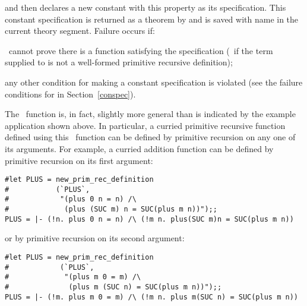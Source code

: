 {{\noindent and then declares a new constant  with this property as its
specification. This constant specification is returned as a theorem by 
 and is saved with name 
in the current theory segment. Failure occurs if:

\begin{myenumerate}
\item \HOL\ cannot prove there is a function satisfying the specification
(\ie\ if the term supplied to  
 is not a well-formed primitive recursive definition);
\item any other condition for making a constant specification is violated
(see the failure conditions for  in 
Section~\ref{conspec}).
\end{myenumerate}

The \ML\  function   is, in  fact, slightly more
general than  is  indicated  by  the  example  application  shown  above.    In
particular, a  curried
primitive  recursive  function defined  using this \ML\
function can be defined  by primitive  recursion on  any one  of its arguments.
For example, a curried  addition function  \ml{plus:num->num->num} can be
defined by primitive recursion on its first argument:

\setcounter{sessioncount}{1}
\begin{session}\begin{verbatim}
#let PLUS = new_prim_rec_definition           
#           (`PLUS`,
#            "(plus 0 n = n) /\                     
#             (plus (SUC m) n = SUC(plus m n))");;
PLUS = |- (!n. plus 0 n = n) /\ (!m n. plus(SUC m)n = SUC(plus m n))
\end{verbatim}\end{session}

\noindent or by primitive recursion on its second argument:

\setcounter{sessioncount}{1}
\begin{session}\begin{verbatim}
#let PLUS = new_prim_rec_definition
#            (`PLUS`,
#             "(plus m 0 = m) /\
#              (plus m (SUC n) = SUC(plus m n))");;
PLUS = |- (!m. plus m 0 = m) /\ (!m n. plus m(SUC n) = SUC(plus m n))
\end{verbatim}\end{session}

}}
